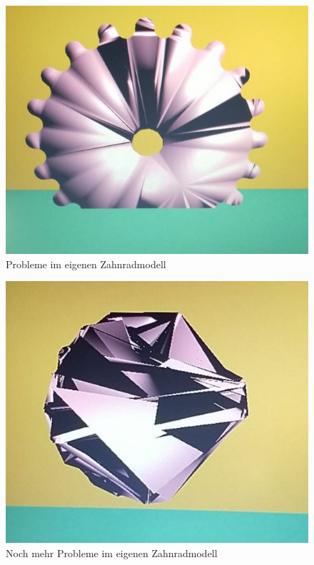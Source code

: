 \documentclass{article}
\begin{document}
\begin{figure}[h!]
\centering
\includegraphics[scale=1.0]{res/Buggy_Gear1.png}
\caption{Probleme im eigenen Zahnradmodell}
\label{fig:bugGear1}
\end{figure}

\begin{figure}[h!]
\centering
\includegraphics[scale=1.0]{res/Buggy_Gear2.png}
\caption{Noch mehr Probleme im eigenen Zahnradmodell}
\label{fig:bugGear2}
\end{figure}
\end{document}
